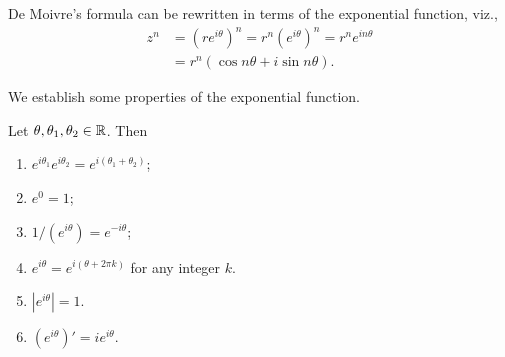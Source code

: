 De Moivre's formula can be rewritten in terms of the exponential function, viz.,
\[
    \begin{aligned}
        z^n &= (re^{i\theta})^n = r^n(e^{i\theta})^n = r^n e^{in\theta}\\
        &= r^n(\cos n\theta + i\sin n\theta).
    \end{aligned}
\]

We establish some properties of the exponential function.

\begin{theorem}
    Let \(\theta, \theta_1, \theta_2 \in \mathbb{R}\). Then
    \begin{enumerate}
        \item \(e^{i\theta_1}e^{i\theta_2} = e^{i(\theta_1 + \theta_2)}\);
        \item \(e^{0} = 1\);
        \item \(1/(e^{i\theta}) = e^{-i\theta}\);
        \item \(e^{i\theta} = e^{i(\theta + 2\pi k)}\) for any integer \(k\).
        \item \(|e^{i\theta}| = 1\).
        \item \((e^{i\theta})' = ie^{i\theta}\).
    \end{enumerate}
    \label{thm:properties-exp}
\end{theorem}

